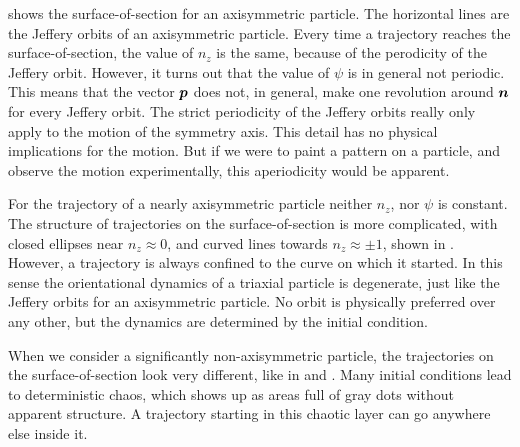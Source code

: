 \documentclass[thesis.tex]{subfiles}
\begin{document}
 shows the surface-of-section for an axisymmetric particle. The horizontal lines are the Jeffery orbits of an axisymmetric particle. Every time a trajectory reaches the surface-of-section, the value of $n_z$ is the same, because of the perodicity of the Jeffery orbit. However, it turns out that the value of $\psi$ is in general not periodic. This means that the vector $\mbox{\boldmath$p$}$ does not, in general, make one revolution around $\mbox{\boldmath$n$}$ for every Jeffery orbit. The strict periodicity of the Jeffery orbits really only apply to the motion of the symmetry axis. This detail has no physical implications for the motion. But if we were to paint a pattern on a particle, and observe the motion experimentally, this aperiodicity would be apparent.

For the trajectory of a nearly axisymmetric particle neither $n_z$, nor $\psi$ is constant. The structure of trajectories on the surface-of-section is more complicated, with closed ellipses near $n_z\approx 0$, and curved lines towards $n_z\approx\pm 1$, shown in .
However, a trajectory is always confined to the curve on which it started. In this sense the orientational dynamics of a triaxial particle is degenerate, just like the Jeffery orbits for an axisymmetric particle. No orbit is physically preferred over any other, but the dynamics are determined by the initial condition.

When we consider a significantly non-axisymmetric particle, the trajectories on the surface-of-section look very different, like in  and . Many initial conditions lead to deterministic chaos, which shows up as areas full of gray dots without apparent structure. A trajectory starting in this chaotic layer can go anywhere else inside it.
\end{document}
